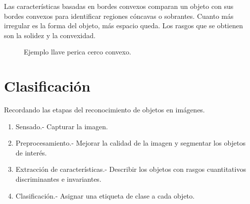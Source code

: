 \documentclass[a4paper, 11pt]{article}
\begin{document}
Las características basadas en bordes convexos comparan un objeto con sus bordes convexos para identificar regiones cóncavas o sobrantes. Cuanto más irregular es la forma del objeto, más espacio queda. Los rasgos que se obtienen son la solidez y la convexidad. 


\begin{figure}[ht]%
    \centering
    \qquad
    \caption{Ejemplo llave perica cerco convexo.}%
    \label{entropia}%
\end{figure}


\pagebreak
\section{Clasificación}

Recordando las etapas del reconocimiento de objetos en imágenes.

\begin{enumerate}
\item Sensado.- Capturar la imagen.
\item Preprocesamiento.- Mejorar la calidad de la imagen y segmentar los objetos de interés.
\item Extracción de características.- Describir los objetos con rasgos cuantitativos discriminantes e invariantes.
\item Clasificación.- Asignar una etiqueta de clase a cada objeto.
\end{enumerate}
\end{document}
